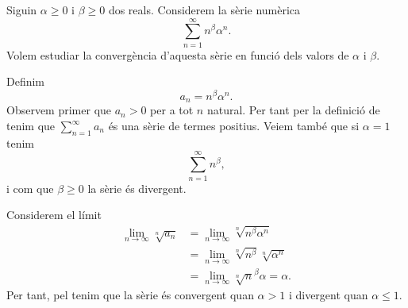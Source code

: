 \documentclass[../../Main.tex]{subfiles}
\begin{document}
	\begin{example}
		Siguin \(\alpha\geq0\) i \(\beta\geq0\) dos reals. Considerem la sèrie numèrica
		\[\sum_{n=1}^{\infty}n^{\beta}\alpha^{n}.\]
		Volem estudiar la convergència d'aquesta sèrie en funció dels valors de \(\alpha\) i \(\beta\).
		\begin{solution}
			Definim
			\[a_{n}=n^{\beta}\alpha^{n}.\]
			Observem primer que \(a_{n}>0\) per a tot \(n\) natural. Per tant per la definició de  tenim que \(\sum_{n=1}^{\infty}a_{n}\) és una sèrie de termes positius. Veiem també que si \(\alpha=1\) tenim
			\[\sum_{n=1}^{\infty}n^{\beta},\]
			i com que \(\beta\geq0\) la sèrie és divergent.
			
			Considerem el límit
			\begin{align*}
			\lim_{n\to\infty}\sqrt[n]{a_{n}}&=\lim_{n\to\infty}\sqrt[n]{n^{\beta}\alpha^{n}}\\
			&=\lim_{n\to\infty}\sqrt[n]{n^{\beta}}\sqrt[n]{\alpha^{n}}\\
			&=\lim_{n\to\infty}\sqrt[n]{n}^{\beta}\alpha=\alpha.
			\end{align*}
			Per tant, pel  tenim que la sèrie és convergent quan \(\alpha>1\) i divergent quan \(\alpha\leq1\). 
		\end{solution}
	\end{example}
\end{document}
